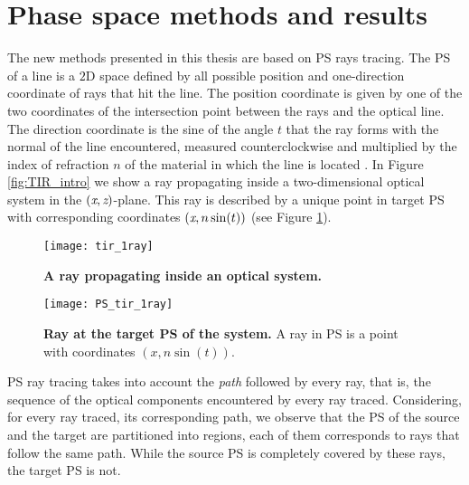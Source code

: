 \section{Phase space methods and results}
The new methods presented in this thesis are based on PS rays tracing. The PS of a line is a $2$D space defined by all possible position and one-direction coordinate of rays that hit the line. 
The position coordinate is given by one of the two coordinates of the intersection point between the rays and the optical line. The direction coordinate is the sine of the angle $t$ that the ray forms with the normal of the line encountered, measured counterclockwise and multiplied by the index of refraction $n$ of the material in which the line is located \cite{wolf2004geometric}. In Figure \ref{fig:TIR_intro} we show a ray propagating inside a two-dimensional optical system in the $(\textit{x}, \textit{z})$-plane. This ray is described by a unique point in target PS with corresponding coordinates $(\textit{x}, n\sin(t))$ (see Figure \ref{fig:PS_intro}).
\begin{figure}[t]
  \begin{minipage}[t]{0.49\textwidth}
    \texttt{[image: tir\_1ray]}
    \caption{\textbf{A ray propagating inside an optical system.}}
    \label{fig:TIR_intro}
  \end{minipage}
\hfill
  \begin{minipage}[t]{0.47\textwidth}
    \texttt{[image: PS\_tir\_1ray]}
  \caption{\textbf{Ray at the target PS of the system.} A ray in PS is a point with coordinates $(x, n\sin(t))$.}
\label{fig:PS_intro}
 \end{minipage}
\end{figure}
PS ray tracing takes into account the \textit{path} followed by every ray, that is, the sequence of the optical components encountered by every ray traced.
Considering, for every ray traced, its corresponding path, we observe that the PS of the source and the target are partitioned into regions, each of them corresponds to rays that follow the same path. 
While the source PS is completely covered by these rays, the target PS is not.

